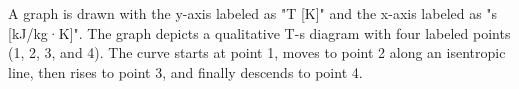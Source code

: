A graph is drawn with the y-axis labeled as "T [K]" and the x-axis labeled as "s [kJ/kg·K]". The graph depicts a qualitative T-s diagram with four labeled points (1, 2, 3, and 4). The curve starts at point 1, moves to point 2 along an isentropic line, then rises to point 3, and finally descends to point 4.